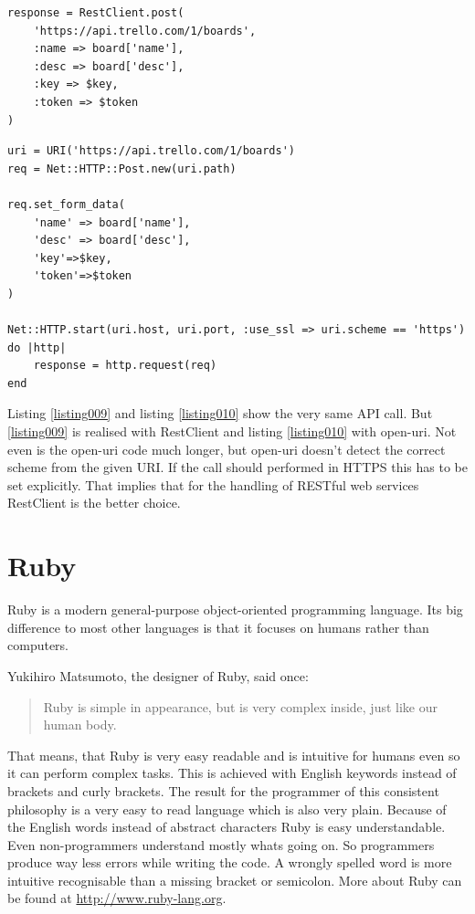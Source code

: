 \begin{lstlisting}[aboveskip=1\baselineskip, caption=POST request using RestClient., label=listing009]
response = RestClient.post(
	'https://api.trello.com/1/boards',
	:name => board['name'], 
	:desc => board['desc'],
	:key => $key,
	:token => $token
)
\end{lstlisting}

\begin{lstlisting}[aboveskip=1\baselineskip, caption=POST request with open-uri., label=listing010]
uri = URI('https://api.trello.com/1/boards')
req = Net::HTTP::Post.new(uri.path)

req.set_form_data(
	'name' => board['name'], 
	'desc' => board['desc'],
	'key'=>$key,
	'token'=>$token
)

Net::HTTP.start(uri.host, uri.port, :use_ssl => uri.scheme == 'https') do |http|
	response = http.request(req)
end
\end{lstlisting}

Listing \ref{listing009} and listing \ref{listing010} show the very same API call. But \ref{listing009} is realised with RestClient and listing \ref{listing010} with open-uri. Not even is the open-uri code much longer, but open-uri doesn't detect the correct scheme from the given URI. If the call should performed in HTTPS this has to be set explicitly. That implies that for the handling of RESTful web services RestClient is the better choice.


\section{Ruby}
Ruby is a modern general-purpose object-oriented programming language. Its big difference to most other languages is that it focuses on humans rather than computers. 

Yukihiro Matsumoto, the designer of Ruby, said once:
\begin{quote}
Ruby is simple in appearance, but is very
complex inside, just like our human body.\cite{ruby:talk}
\end{quote}

That means, that Ruby is very easy readable and is intuitive for humans even so it can perform complex tasks. This is achieved with English keywords instead of brackets and curly brackets. The result for the programmer of this consistent philosophy is a very easy to read language which is also very plain. Because of the English words instead of abstract characters Ruby is easy understandable. Even non-programmers understand mostly whats going on. So programmers produce way less errors while writing the code. A wrongly spelled word is more intuitive recognisable than a missing bracket or semicolon. \cite{ruby:about} More about Ruby can be found at \url{http://www.ruby-lang.org}.

